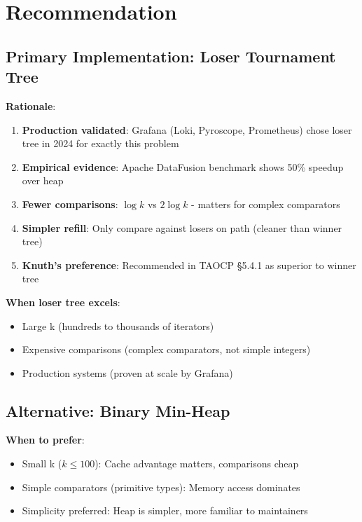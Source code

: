 \documentclass[11pt]{article}
\begin{document}
\section{Recommendation}

\subsection{Primary Implementation: Loser Tournament Tree}

\textbf{Rationale}:
\begin{enumerate}
    \item \textbf{Production validated}: Grafana (Loki, Pyroscope, Prometheus) chose loser tree in 2024 for exactly this problem
    \item \textbf{Empirical evidence}: Apache DataFusion benchmark shows 50\% speedup over heap
    \item \textbf{Fewer comparisons}: $\log k$ vs $2 \log k$ - matters for complex comparators
    \item \textbf{Simpler refill}: Only compare against losers on path (cleaner than winner tree)
    \item \textbf{Knuth's preference}: Recommended in TAOCP §5.4.1 as superior to winner tree
\end{enumerate}

\textbf{When loser tree excels}:
\begin{itemize}
    \item Large k (hundreds to thousands of iterators)
    \item Expensive comparisons (complex comparators, not simple integers)
    \item Production systems (proven at scale by Grafana)
\end{itemize}

\subsection{Alternative: Binary Min-Heap}

\textbf{When to prefer}:
\begin{itemize}
    \item Small k ($k \leq 100$): Cache advantage matters, comparisons cheap
    \item Simple comparators (primitive types): Memory access dominates
    \item Simplicity preferred: Heap is simpler, more familiar to maintainers
\end{itemize}
\end{document}
